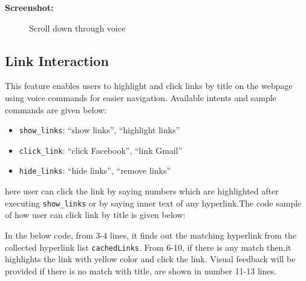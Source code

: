 \vspace{1in} 

\textbf{Screenshot:}

\begin{figure}[H] 
    \centering
    \caption{Scroll down through voice}
    \label{fig:scroll_down}
\end{figure}

\subsection{Link Interaction}
This feature enables users to highlight and click links by title on the webpage using voice commands for easier navigation. Available intents and sample commands are given below:

\begin{itemize}
    \item \texttt{show\_links}: ``show links'', ``highlight links''
    \item \texttt{click\_link}: ``click Facebook'', ``link Gmail''
    \item \texttt{hide\_links}: ``hide links'', ``remove links''
\end{itemize}

here user can click the link by saying numbers which are highlighted 
after executing \texttt{show\_links} or by saying inner text of any hyperlink.The code sample of how user can click link by title is given below:

In the below code, from 3-4 lines, it finds out the matching hyperlink from the collected hyperlink list \texttt{cachedLinks}. From 6-10, if there is any match then,it highlights the link with yellow color and click the link. Visual feedback will be provided if there is no match with title, are shown in number 11-13 lines. 

